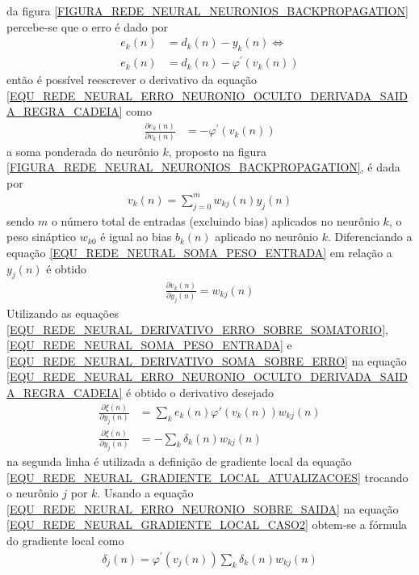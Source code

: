 da figura \ref{FIGURA_REDE_NEURAL_NEURONIOS_BACKPROPAGATION} percebe-se que o erro é dado por
\begin{align}
e_{k}(n) &= d_{k}(n) - y_{k}(n) \Leftrightarrow \\
e_{k}(n) &= d_{k}(n) - \varphi^{'}(v_{k}(n))
\end{align}
então é possível reescrever o derivativo da equação \eqref{EQU_REDE_NEURAL_ERRO_NEURONIO_OCULTO_DERIVADA_SAIDA_REGRA_CADEIA} como
\begin{align}
\frac{\partial e_{k}(n)}{\partial v_{k}(n)} &= -\varphi^{'}(v_{k}(n))	\label{EQU_REDE_NEURAL_DERIVATIVO_ERRO_SOBRE_SOMATORIO}	   
\end{align}
a soma ponderada do neurônio \(k\), proposto na figura \ref{FIGURA_REDE_NEURAL_NEURONIOS_BACKPROPAGATION}, é dada por
\begin{align}
v_{k}(n) = \sum\limits_{j = 0}^{m} w_{kj}(n)y_{j}(n)  \label{EQU_REDE_NEURAL_SOMA_PESO_ENTRADA}
\end{align}
sendo \(m\) o número total de entradas (excluindo bias) aplicados no neurônio \(k\), o peso sináptico \(w_{k0}\) é igual ao bias \(b_{k}(n)\) aplicado no neurônio \(k\). Diferenciando a equação \eqref{EQU_REDE_NEURAL_SOMA_PESO_ENTRADA} em relação a \(y_{j}(n)\) é obtido
\begin{align}
\frac{\partial v_{k}(n)}{\partial y_{j}(n)} = w_{kj}(n) \label{EQU_REDE_NEURAL_DERIVATIVO_SOMA_SOBRE_ERRO}
\end{align}
Utilizando as equações \eqref{EQU_REDE_NEURAL_DERIVATIVO_ERRO_SOBRE_SOMATORIO}, \eqref{EQU_REDE_NEURAL_SOMA_PESO_ENTRADA} e \eqref{EQU_REDE_NEURAL_DERIVATIVO_SOMA_SOBRE_ERRO} na equação \eqref{EQU_REDE_NEURAL_ERRO_NEURONIO_OCULTO_DERIVADA_SAIDA_REGRA_CADEIA} é obtido o derivativo desejado
\begin{align}
\frac{\partial \xi(n)}{\partial y_{j}(n)} &= \sum\limits_{k} e_{k}(n)\varphi{'}(v_{k}(n))w_{kj}(n) \\
\frac{\partial \xi(n)}{\partial y_{j}(n)} &= -\sum\limits_{k}\delta_{k}(n)w_{kj}(n) \label{EQU_REDE_NEURAL_ERRO_NEURONIO_SOBRE_SAIDA}
\end{align}
na segunda linha é utilizada a definição de gradiente local da equação \eqref{EQU_REDE_NEURAL_GRADIENTE_LOCAL_ATUALIZACOES} trocando o neurônio \(j\) por \(k\). Usando a equação \eqref{EQU_REDE_NEURAL_ERRO_NEURONIO_SOBRE_SAIDA} na equação \eqref{EQU_REDE_NEURAL_GRADIENTE_LOCAL_CASO2} obtem-se a fórmula do gradiente local como
\begin{align}
\delta_{j}(n) = \varphi^{'}(v_{j}(n)) \sum\limits_{k}\delta_{k}(n)w_{kj}(n)
\end{align}

